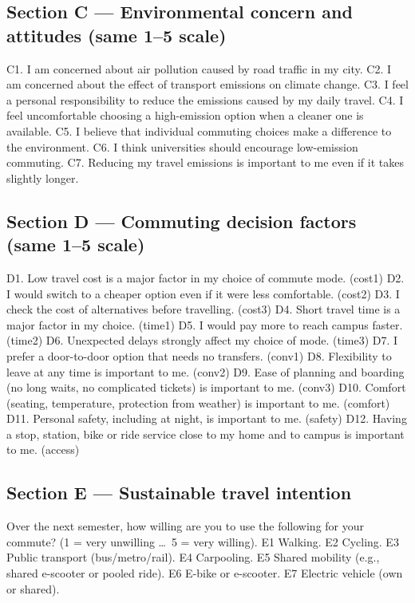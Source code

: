 \documentclass[11pt,a4paper]{article}
\begin{document}
\subsection*{Section C --- Environmental concern and attitudes (same 1--5 scale)}
C1. I am concerned about air pollution caused by road traffic in my city. C2. I am concerned about the
effect of transport emissions on climate change. C3. I feel a personal responsibility to reduce the
emissions caused by my daily travel. C4. I feel uncomfortable choosing a high-emission option when a
cleaner one is available. C5. I believe that individual commuting choices make a difference to the
environment. C6. I think universities should encourage low-emission commuting. C7. Reducing my travel
emissions is important to me even if it takes slightly longer.

\subsection*{Section D --- Commuting decision factors (same 1--5 scale)}
D1. Low travel cost is a major factor in my choice of commute mode. (cost1) D2. I would switch to a
cheaper option even if it were less comfortable. (cost2) D3. I check the cost of alternatives before
travelling. (cost3) D4. Short travel time is a major factor in my choice. (time1) D5. I would pay more
to reach campus faster. (time2) D6. Unexpected delays strongly affect my choice of mode. (time3)
D7. I prefer a door-to-door option that needs no transfers. (conv1) D8. Flexibility to leave at any
time is important to me. (conv2) D9. Ease of planning and boarding (no long waits, no complicated
tickets) is important to me. (conv3) D10. Comfort (seating, temperature, protection from weather) is
important to me. (comfort) D11. Personal safety, including at night, is important to me. (safety)
D12. Having a stop, station, bike or ride service close to my home and to campus is important to me.
(access)

\subsection*{Section E --- Sustainable travel intention}
Over the next semester, how willing are you to use the following for your commute?
(1 = very unwilling \dots\ 5 = very willing). E1 Walking. E2 Cycling. E3 Public transport
(bus/metro/rail). E4 Carpooling. E5 Shared mobility (e.g., shared e-scooter or pooled ride).
E6 E-bike or e-scooter. E7 Electric vehicle (own or shared).
\end{document}
